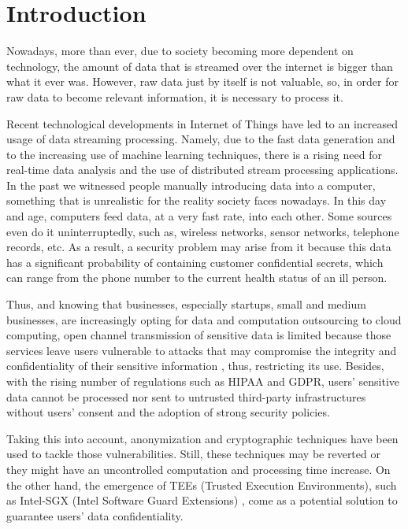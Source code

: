 \chapter{Introduction}\label{c:intro}

Nowadays, more than ever, due to society becoming more dependent on technology, the amount of data that is streamed over the internet is bigger than what it ever was. However, raw data just by itself is not valuable, so, in order for raw data to become relevant information, it is necessary to process it.

Recent technological developments in Internet of Things have led to an increased usage of data streaming processing. Namely, due to the fast data generation and to the increasing use of machine learning techniques, there is a rising need for real-time data analysis and the use of distributed stream processing applications.
In the past we witnessed people manually introducing data into a computer, something that is unrealistic for the reality society faces nowadays. In this day and age, computers feed data, at a very fast rate, into each other. Some sources even do it uninterruptedly, such as, wireless networks, sensor networks, telephone records, etc. \cite{dataprocessingbook} %
As a result, a security problem may arise from it because this data has a significant probability of containing customer confidential secrets, which can range from the phone number to the current health status of an ill person. \cite{anonymizingstreamingdata, 7024651} %

Thus, and knowing that businesses, especially startups, small and medium businesses, are increasingly opting for data and computation outsourcing to cloud computing, open channel transmission of sensitive data is limited because those services leave users vulnerable to attacks that may compromise the integrity and confidentiality of their sensitive information \cite{soteria, 6227695, IQBAL201698, 5655240}, thus, restricting its use.
Besides, with the rising number of regulations such as HIPAA and GDPR, users' sensitive data cannot be processed nor sent to untrusted third-party infrastructures without users’ consent and the adoption of strong security policies. \cite{usersdataarticle, dataprotection}

Taking this into account, anonymization and cryptographic techniques have been used to tackle those vulnerabilities. Still, these techniques may be reverted or they might have an uncontrolled computation and processing time increase. On the other hand, the emergence of TEEs (Trusted Execution Environments), such as Intel-SGX (Intel Software Guard Extensions) \cite{intelsgxexplained}, come as a potential solution to guarantee users’ data confidentiality. 

